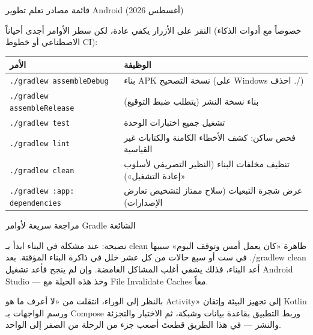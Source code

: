 \begin{center}\small\color{gray}قائمة مصادر تعلم تطوير Android (أغسطس 2026)\end{center}


النقر على الأزرار يكفي عادة، لكن سطر الأوامر أجدى أحياناً (خصوصاً مع أدوات الذكاء الاصطناعي أو خطوط CI):

\begin{center}
\begin{tabularx}{\linewidth}{|X|X|}
\hline
\textbf{الأمر} & \textbf{الوظيفة} \tabularnewline
\hline
\texttt{.\allowbreak /\allowbreak gradlew assembleDebug} & بناء APK نسخة التصحيح (على Windows احذف ./) \tabularnewline
\texttt{.\allowbreak /\allowbreak gradlew assembleRelease} & بناء نسخة النشر (يتطلب ضبط التوقيع) \tabularnewline
\texttt{.\allowbreak /\allowbreak gradlew test} & تشغيل جميع اختبارات الوحدة \tabularnewline
\texttt{.\allowbreak /\allowbreak gradlew lint} & فحص ساكن: كشف الأخطاء الكامنة والكتابات غير القياسية \tabularnewline
\texttt{.\allowbreak /\allowbreak gradlew clean} & تنظيف مخلفات البناء (النظير التصريفي لأسلوب «إعادة التشغيل») \tabularnewline
\texttt{.\allowbreak /\allowbreak gradlew :app: dependencies} & عرض شجرة التبعيات (سلاح ممتاز لتشخيص تعارض الإصدارات) \tabularnewline
\hline
\end{tabularx}
\end{center}

\begin{center}\small\color{gray}مراجعة سريعة لأوامر Gradle الشائعة\end{center}

\begin{tcbinfo}{نصيحة: عند مشكلة في البناء ابدأ بـ clean}
ظاهرة «كان يعمل أمس وتوقف اليوم» سببها في ست أو سبع حالات من كل عشر خلل في ذاكرة البناء المؤقتة. بعد ./gradlew clean أعد البناء، فذلك يشفي أغلب المشاكل الغامضة. وإن لم ينجح فأعد تشغيل Android Studio — وخذ هذه الحيلة مع File Invalidate Caches معاً.

\end{tcbinfo}



بالنظر إلى الوراء، انتقلت من «لا أعرف ما هو Activity» إلى تجهيز البيئة وإتقان Kotlin ورسم الواجهات بـ Compose وربط التطبيق بقاعدة بيانات وشبكة، ثم الاختبار والتجزئة والنشر — في هذا الطريق قطعتَ أصعب جزء من الرحلة من الصفر إلى الواحد.

